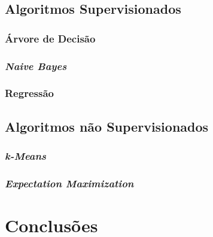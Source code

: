 \documentclass{article}
\begin{document}
\subsection{Algoritmos Supervisionados}

\subsubsection{Árvore de Decisão}

\subsubsection{{\b \it Naive Bayes}}

\subsubsection{Regressão}

\subsection{Algoritmos não Supervisionados}

\subsubsection{{\b \it k-Means}}

\subsubsection{{\b \it Expectation Maximization}}

\section{Conclusões}


\end{document}
